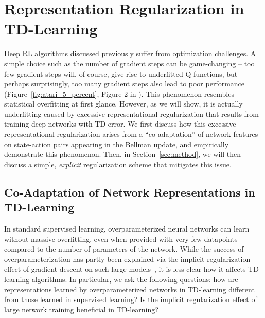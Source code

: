 \section{Representation Regularization in TD-Learning}
\label{sec:problem}

Deep RL algorithms discussed previously suffer from optimization challenges. A simple choice such as the number of gradient steps can be game-changing -- too few gradient steps will, of course, give rise to underfitted Q-functions, but perhaps surprisingly, too many gradient steps also lead to poor performance (Figure~\ref{fig:atari_5_percent}, Figure 2 in \citep{kumar2021implicit}).
This phenomenon resembles statistical overfitting at first glance. However, as we will show, it is actually underfitting caused by excessive representational regularization that results from training deep networks with TD error. We first discuss how this excessive representational regularization arises from a ``co-adaptation'' of network features on state-action pairs appearing in the Bellman update, and empirically demonstrate this phenomenon. Then, in Section~\ref{sec:method}, we will then discuss a simple, \textit{explicit} regularization scheme that mitigates this issue.   

\subsection{Co-Adaptation of Network Representations in TD-Learning}
In standard supervised learning, overparameterized neural networks can learn without massive overfitting, even when provided with very few datapoints compared to the number of parameters of the network. While the success of overparameterization has partly been explained via the implicit regularization effect of gradient descent on such large models~\citep{arora2018optimization,arora2019implicit,gunasekar2017implicit,gunasekar2018implicit}, it is less clear how it affects TD-learning algorithms. In particular, we ask the following questions: how are representations learned by overparameterized networks in TD-learning different from those learned in supervised learning? Is the implicit regularization effect of large network training beneficial in TD-learning? 

